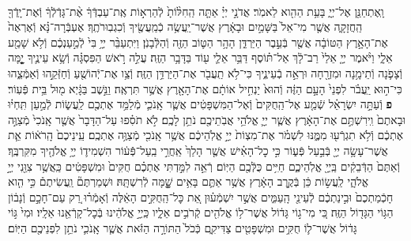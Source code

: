 \documentclass[twoside, openany, parskip=half, 11pt]{book}
\begin{document}
\begin{sometimes}
\begin{footnotesize}
\begin{multicols}{2}
\\
וָֽאֶתְחַנַּ֖ן אֶל־יְיָ֑ בָּעֵ֥ת הַהִ֖וא לֵאמֹֽר׃ אֲדֹנָ֣י יְיָ֗ אַתָּ֤ה הַֽחִלּ֨וֹתָ֙ לְֿהַרְא֣וֹת אֶֽת־עַבְדְּֿךָ֔ אֶ֨ת־גָּדְֿלְֿךָ֔ וְֿאֶת־יָֽדְֿךָ֖ הַֽחֲזָקָ֑ה אֲשֶׁ֤ר מִי־אֵל֙ בַּשָּׁמַ֣יִם וּבָאָ֔רֶץ אֲשֶׁר־יַֽעֲשֶׂ֥ה כְֿמַֽעֲשֶׂ֖יךָ וְֿכִגְבֽוּרֹתֶֽךָ׃ אֶעְבְּֿרָה־נָּ֗א וְֿאֶרְאֶה֙ אֶת־הָאָ֣רֶץ הַטּוֹבָ֔ה אֲשֶׁ֖ר בְּֿעֵ֣בֶר הַיַּרְדֵּ֑ן הָהָ֥ר הַטּ֛וֹב הַזֶּ֖ה וְֿהַלְּֿבָנֹֽן׃  וַיִּתְעַבֵּ֨ר יְיָ֥ בִּי֙ לְֿמַ֣עַנְכֶ֔ם וְֿלֹ֥א שָׁמַ֖ע אֵלָ֑י וַיֹּ֨אמֶר יְיָ֤ אֵלַי֙ רַב־לָ֔ךְ אַל־תּ֗וֹסֶף דַּבֵּ֥ר אֵלַ֛י ע֖וֹד בַּדָּבָ֥ר הַזֶּֽה׃ עֲלֵ֣ה רֹ֣אשׁ הַפִּסְגָּ֗ה וְֿשָׂ֥א עֵינֶ֛יךָ יׇׇׇׇׇׇָ֧מָּה וְֿצָפֹ֛נָה וְֿתֵימָ֥נָה וּמִזְרָ֖חָה וּרְאֵ֣ה בְֿעֵינֶ֑יךָ כִּי־לֹ֥א תַֽעֲבֹ֖ר אֶת־הַיַּרְדֵּ֥ן הַזֶּֽה׃ וְֿצַ֥ו אֶת־יְֿהוֹשֻׁ֖עַ וְֿחַזְּֿקֵ֣הוּ וְֿאַמְּֿצֵ֑הוּ כִּי־ה֣וּא יַֽעֲבֹ֗ר לִפְנֵי֙ הָעָ֣ם הַזֶּ֔ה וְֿהוּא֙ יַנְחִ֣יל אוֹתָ֔ם אֶת־הָאָ֖רֶץ אֲשֶׁ֥ר תִּרְאֶֽה׃ וַנֵּ֣שֶׁב בַּגָּ֔יְא מ֖וּל בֵּ֥ית פְּֿעֽוֹר׃ \textbf{פ}
וְֿעַתָּ֣ה יִשְׂרָאֵ֗ל שְֿׁמַ֤ע אֶל־הַֽחֻקִּים֙ וְֿאֶל־הַמִּשְׁפָּטִ֔ים אֲשֶׁ֧ר אָֽנֹכִ֛י מְֿלַמֵּ֥ד אֶתְכֶ֖ם לַֽעֲשׂ֑וֹת לְֿמַ֣עַן תִּֽחְי֗וּ וּבָאתֶם֙ וִֽירִשְׁתֶּ֣ם אֶת־הָאָ֔רֶץ אֲשֶׁ֧ר יְיָ֛ אֱלֹהֵ֥י אֲבֹֽתֵיכֶ֖ם נֹתֵ֥ן לָכֶֽם׃ לֹ֣א תֹסִ֗פוּ עַל־הַדָּבָר֙ אֲשֶׁ֤ר אָֽנֹכִי֙ מְֿצַוֶּ֣ה אֶתְכֶ֔ם וְֿלֹ֥א תִגְרְֿע֖וּ מִמֶּ֑נּוּ לִשְׁמֹ֗ר אֶת־מִצְוֹת֙ יְיָ֣ אֱלֹֽהֵיכֶ֔ם אֲשֶׁ֥ר אָֽנֹכִ֖י מְֿצַוֶּ֥ה אֶתְכֶֽם׃ עֵֽינֵיכֶם֙ הָֽרֹא֔וֹת אֵ֛ת אֲשֶׁר־עָשָׂ֥ה יְיָ֖ בְּֿבַ֣עַל פְּֿע֑וֹר כִּ֣י כׇל־הָאִ֗ישׁ אֲשֶׁ֤ר הָלַךְ֙ אַֽחֲרֵ֣י בַֽעַל־פְּֿֿע֔וֹר הִשְׁמִיד֛וֹ יְיָ֥ אֱלֹהֶ֖יךָ מִקִּרְבֶּֽךָ׃ וְֿאַתֶּם֙ הַדְּֿבֵקִ֔ים בַּֽיְיָ֖ אֱלֹֽהֵיכֶ֑ם חַיִּ֥ים כֻּלְּֿכֶ֖ם הַיּֽוֹם׃  רְֿאֵ֣ה לִמַּ֣דְתִּי אֶתְכֶ֗ם חֻקִּים֙ וּמִשְׁפָּטִ֔ים כַּֽאֲשֶׁ֥ר צִוַּ֖נִי יְיָ֣ אֱלֹהָ֑י לַֽעֲשׂ֣וֹת כֵּ֔ן בְּֿקֶ֣רֶב הָאָ֔רֶץ אֲשֶׁ֥ר אַתֶּ֛ם בָּאִ֥ים שׇׇׇׇׇׇָׁ֖מָּה לְֿרִשְׁתָּֽהּ׃ וּשְׁמַרְתֶּם֘ וַֽעֲשִׂיתֶם֒ כִּ֣י הִ֤וא חָכְֿמַתְכֶם֙ וּבִ֣ינַתְכֶ֔ם לְֿעֵינֵ֖י הָֽעַמִּ֑ים אֲשֶׁ֣ר יִשְׁמְֿע֗וּן אֵ֚ת כׇּל־הַֽחֻקִּ֣ים הָאֵ֔לֶּה וְֿאָמְֿר֗וּ רַ֚ק עַם־חָכָ֣ם וְֿנָב֔וֹן הַגּ֥וֹי הַגָּד֖וֹל הַזֶּֽה׃ כִּ֚י מִי־ג֣וֹי גָּד֔וֹל אֲשֶׁר־ל֥וֹ אֱלֹהִ֖ים קְֿרֹבִ֣ים אֵלָ֑יו כַּֽיְיָ֣ אֱלֹהֵ֔ינוּ בְּֿכׇל־קָרְֿאֵ֖נוּ אֵלָֽיו׃ וּמִי֙ גּ֣וֹי גָּד֔וֹל אֲשֶׁר־ל֛וֹ חֻקִּ֥ים וּמִשְׁפָּטִ֖ים צַדִּיקִ֑ם כְּֿכֹל֙ הַתּוֹרָ֣ה הַזֹּ֔את אֲשֶׁ֧ר אָֽנֹכִ֛י נֹתֵ֥ן לִפְנֵיכֶ֖ם הַיּֽוֹם׃


\end{multicols}
\end{footnotesize}
\end{sometimes}
\end{document}
